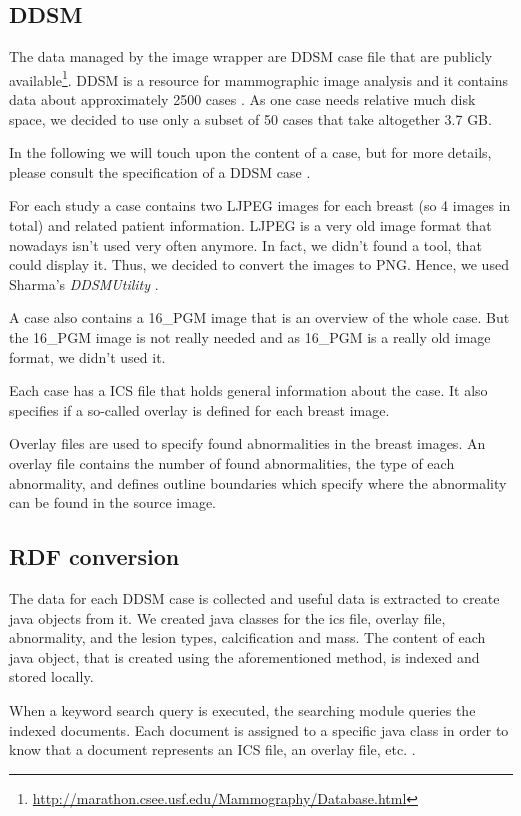\subsection{DDSM}

The data managed by the image wrapper are DDSM case file that are publicly available\footnote{\url{http://marathon.csee.usf.edu/Mammography/Database.html}}.
DDSM is a resource for mammographic image analysis and it contains data about approximately 2500 cases \cite{DDSM}. As one case needs relative much disk space, we decided to use only a subset of 50 cases that take altogether 3.7 GB.

In the following we will touch upon the content of a case, but for more details, please consult the specification of a DDSM case \cite{DDSM_CASE_SPEC}. 

For each study a case contains two LJPEG images for each breast (so 4 images in total) and related patient information. LJPEG is a very old image format that nowadays isn’t used very often anymore. In fact, we didn't found a tool, that could display it. Thus, we decided to convert the images to PNG. Hence, we used Sharma's \emph{DDSMUtility} \cite{DDSM_UTILITY}.

A case also contains a 16\_PGM image that is an overview of the whole case. But the 16\_PGM image is not really needed and as 16\_PGM is a really old image format, we didn't used it.

Each case has a ICS file that holds general information about the case. It also specifies if a so-called overlay is defined for each breast image. 

Overlay files are used to specify found abnormalities in the breast images. An overlay file contains the number of found abnormalities, the type of each abnormality, and defines outline boundaries which specify where the abnormality can be found in the source image.

\subsection{RDF conversion}

The data for each DDSM case is collected and useful data is extracted to create java objects from it. We created java classes for the ics file, overlay file, abnormality, and the lesion types, calcification and mass. The content of each java object, that is created using the aforementioned method, is indexed and stored locally. 

When a keyword search query is executed, the searching module queries the indexed documents. Each document is assigned to a specific java class in order to know that a document represents an ICS file, an overlay file, etc. .  

